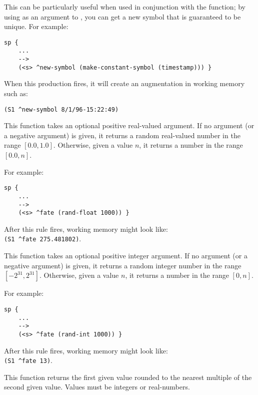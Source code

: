 \begin{description}
This can be particularly useful when used in conjunction with the
 function; by using  as an argument to
, you can get a new symbol that is
guaranteed to be unique. For example:

\begin{verbatim}
sp {
    ...
    -->
    (<s> ^new-symbol (make-constant-symbol (timestamp))) }
\end{verbatim}

When this production fires, it will create an augmentation in working
memory such as:

\begin{verbatim}
(S1 ^new-symbol 8/1/96-15:22:49)
\end{verbatim}    


\item [\soarb{rand-float} --- ] This function takes an optional positive real-valued argument.
If no argument (or a negative argument) is given, it returns a random real-valued number in the range $[0.0,1.0]$.
Otherwise, given a value $n$, it returns a number in the range $[0.0, n]$.

For example:

\begin{verbatim}
sp {
    ...
    -->
    (<s> ^fate (rand-float 1000)) }
\end{verbatim}

After this rule fires, working memory might look like: \\
\verb|(S1 ^fate 275.481802)|.


\item [\soarb{rand-int} --- ] This function takes an optional positive integer argument.
If no argument (or a negative argument) is given, it returns a random integer number in the range $[-2^{31}, 2^{31}]$.
Otherwise, given a value $n$, it returns a number in the range $[0, n]$.

For example:

\begin{verbatim}
sp {
    ...
    -->
    (<s> ^fate (rand-int 1000)) }
\end{verbatim}

After this rule fires, working memory might look like: \\
\verb|(S1 ^fate 13)|.


\item [\soarb{round-off} --- ] This function returns the first given 
value rounded to the nearest multiple of the second given value.
Values must be integers or real-numbers.


\end{description}
